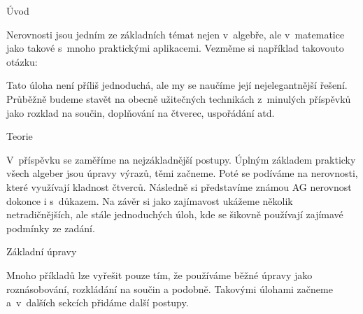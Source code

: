





\sec Úvod

Nerovnosti jsou jedním ze základních témat nejen v~algebře, ale v~matematice jako takové s~mnoho praktickými aplikacemi. Vezměme si například takovouto otázku: 


Tato úloha není příliš jednoduchá, ale my se naučíme její nejelegantnější řešení. Průběžně budeme stavět na obecně užitečných technikách z~minulých příspěvků jako rozklad na součin, doplňování na čtverec, uspořádání atd.

\sec Teorie 

V~příspěvku se zaměříme na nejzákladnější postupy. Úplným základem prakticky všech algeber jsou úpravy výrazů, těmi začneme. Poté se podíváme na nerovnosti, které využívají kladnost čtverců. Následně si představíme známou AG nerovnost dokonce i s~důkazem. Na závěr si jako zajímavost ukážeme několik netradičnějších, ale stále jednoduchých úloh, kde se šikovně používají zajímavé podmínky ze zadání.

\secc Základní úpravy

Mnoho příkladů lze vyřešit pouze tím, že používáme běžné úpravy jako roznásobování, rozkládání na součin a podobně. Takovými úlohami začneme a~v~dalších sekcích přidáme další postupy.


